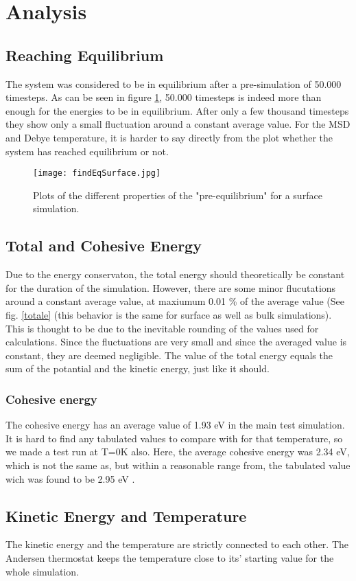 \section{Analysis}

\subsection{Reaching Equilibrium}
The system was considered to be in equilibrium after a pre-simulation of 50.000 timesteps. As can be seen in figure \ref{findeq}, 50.000 timesteps is indeed more than enough for the energies to be in equilibrium. After only a few thousand timesteps they show only a small fluctuation around a constant average value. For the MSD and Debye temperature, it is harder to say directly from the plot whether the system has reached equilibrium or not.
\begin{figure}[H]
	\centering
	\texttt{[image: findEqSurface.jpg]}
	\caption{Plots of the different properties of the "pre-equilibrium" for a surface simulation.}
	\label{findeq}
\end{figure}
\subsection{Total and Cohesive Energy}
Due to the energy conservaton, the total energy should theoretically be constant for the duration of the simulation. However, there are some minor flucutations around a constant average value, at maxiumum 0.01 \% of the average value (See fig. \ref{totale} (this behavior is the same for surface as well as bulk simulations). This is thought to be due to the inevitable rounding of the values used for calculations. Since the fluctuations are very small and since the averaged value is constant, they are deemed negligible. 
The value of the total energy equals the sum of the potantial and the kinetic energy, just like it should.
\subsubsection{Cohesive energy}
The cohesive energy has an average value of 1.93 eV in the main test simulation. It is hard to find any tabulated values to compare with for that temperature, so we made a test run at T=0K also. Here, the average cohesive energy was 2.34 eV, which is not the same as, but within a reasonable range from, the tabulated value wich was found to be 2.95 eV \cite{kittel}.

\subsection{Kinetic Energy and Temperature}
The kinetic energy and the temperature are strictly connected to each other. The Andersen thermostat keeps the temperature close to its' starting value for the whole simulation.

